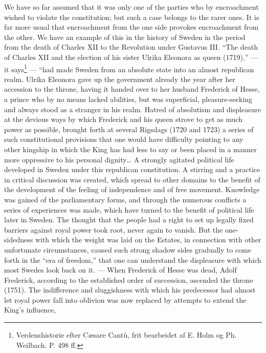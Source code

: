 \documentclass[12pt,a4paper,openany]{book}
\newcommand{\opage}[1]{\marginnote{\footnotesize\textit{[#1]}}}
\begin{document}
We have so far assumed that it was only one of the parties
who by encroachment wished to violate the constitution;
but such a case belongs to the rarer ones. It is
far more usual that encroachment from the one side
provokes encroachment from the other. We have an example
of this in the history of Sweden in the period from the
death of Charles XII to the Revolution under Gustavus III. ``The
death of Charles XII and the election of his sister Ulrika Eleonora as queen
(1719),'' --- it says\footnote{Verdenshistorie efter Cæsare Cantù, frit bearbeidet af E. Holm og Ph. Weilbach. P. 498 ff.} --- ``had made Sweden
from an absolute state into an almost republican
\setcounter{footnote}{0}%
\opage{30}realm. Ulrika Eleonora gave up the government already the year after
her accession to the throne, having it handed over
to her husband Frederick of Hesse, a prince who by no means
lacked abilities, but was superficial, pleasure-seeking
and always stood as a stranger in his realm. Hatred of
absolutism and displeasure at the devious ways by which Frederick
and his queen strove to get as much power
as possible, brought forth at several Rigsdags (1720 and 1723)
a series of such constitutional provisions that one
would have difficulty pointing to any other kingship
in which the King has had less to say or been placed
in a manner more oppressive to his personal
dignity\dots{} A strongly agitated political life developed
in Sweden under this republican constitution.
A stirring and a practice in critical
discussion was created, which spread to other domains
to the benefit of the development of the feeling of independence and
of free movement. Knowledge was gained of the parliamentary
forms, and through the numerous conflicts
a series of experiences was made, which have turned to the benefit of
political life later in Sweden. The thought that the people
had a right to set up legally fixed barriers
against royal power took root, never again to vanish.
But the one-sidedness with which the weight was laid on the
Estates, in connection with other unfortunate circumstances, caused
such strong shadow sides gradually to come forth
in the ``era of freedom,'' that one can understand the displeasure
with which most Swedes look back on it.
--- When Frederick of Hesse was dead, Adolf Frederick, according to the established
order of succession, ascended the throne (1751).
The indifference and sluggishness with which his predecessor
had almost let royal power fall into oblivion
\setcounter{footnote}{0}%
\opage{31}was now replaced by attempts to extend the King's influence,
\end{document}
